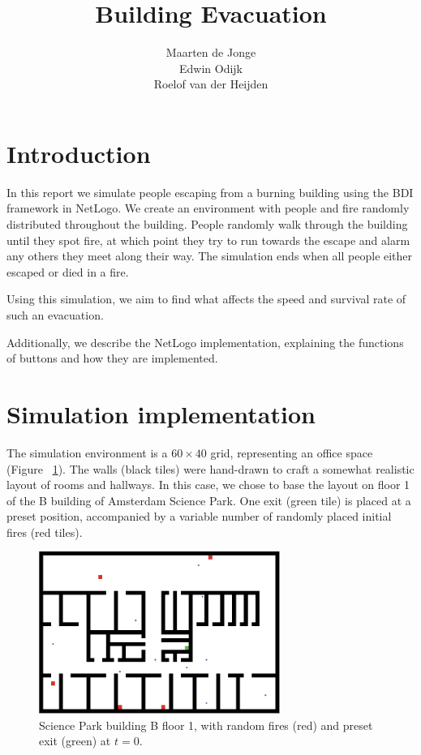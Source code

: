 \documentclass[a4paper]{article}
\title{Building Evacuation}
\author{Maarten de Jonge \\
        Edwin Odijk \\
        Roelof van der Heijden}
\begin{document}
\maketitle

\section{Introduction}
In this report we simulate people escaping from a burning building using the BDI framework in NetLogo. We create an environment with people and fire randomly distributed throughout the building. People randomly walk through the building until they spot fire, at which point they try to run towards the escape and alarm any others they meet along their way. The simulation ends when all people either escaped or died in a fire.

Using this simulation, we aim to find what affects the speed and survival rate of such an evacuation.

Additionally, we describe the NetLogo implementation, explaining the functions of buttons and how they are implemented.

\section{Simulation implementation}
\FloatBarrier
The simulation environment is a \(60\times 40\) grid, representing an office space (Figure~
\ref{fig:sp}). The walls (black tiles) were hand-drawn to craft a somewhat
realistic layout of rooms and hallways. In this case, we chose to base the layout on floor 1 of the B building of Amsterdam Science Park. One exit (green tile) is placed
at a preset position, accompanied by a variable number of randomly placed initial fires (red tiles). 

\begin{figure}[h!]
  \centering
  \includegraphics[width=0.7\textwidth]{sp.png}
  \caption{Science Park building B floor 1, with random fires (red) and preset exit (green) at \(t=0\).}
  \label{fig:sp}
\end{figure}
\end{document}

